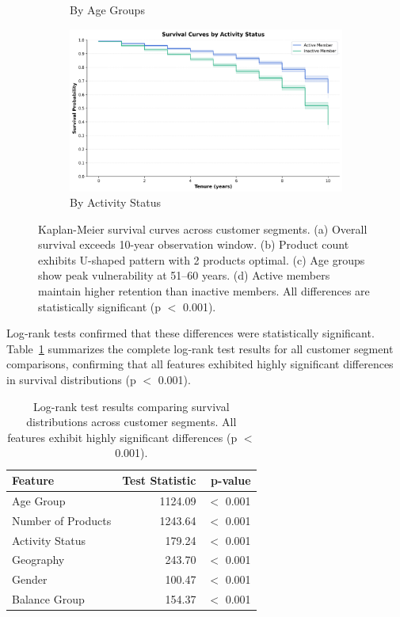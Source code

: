\documentclass[12pt]{article}
\begin{document}
\begin{figure}[H]
\begin{subfigure}[b]{0.48\textwidth}
\caption{By Age Groups}
\label{fig:survival_age}
\end{subfigure}
\hfill
\begin{subfigure}[b]{0.48\textwidth}
\centering
\includegraphics[width=\textwidth]{img/12_survival_active_status_plot.png}
\caption{By Activity Status}
\label{fig:survival_active}
\end{subfigure}
\caption{Kaplan-Meier survival curves across customer segments. (a) Overall survival exceeds 10-year observation window. (b) Product count exhibits U-shaped pattern with 2 products optimal. (c) Age groups show peak vulnerability at 51–60 years. (d) Active members maintain higher retention than inactive members. All differences are statistically significant (p $<$ 0.001).}
\label{fig:survival_all}
\end{figure}

Log‑rank tests confirmed that these differences were statistically significant. Table~\ref{tab:logrank_results} summarizes the complete log‑rank test results for all customer segment comparisons, confirming that all features exhibited highly significant differences in survival distributions (p $<$ 0.001).

\begin{table}[H]
\centering
\small
\caption{Log-rank test results comparing survival distributions across customer segments. All features exhibit highly significant differences (p $<$ 0.001).}
\label{tab:logrank_results}
\begin{tabular}{lrr}
\toprule
\textbf{Feature} & \textbf{Test Statistic} & \textbf{p-value} \\
\midrule
Age Group & 1124.09 & $<$ 0.001 \\
Number of Products & 1243.64 & $<$ 0.001 \\
Activity Status & 179.24 & $<$ 0.001 \\
Geography & 243.70 & $<$ 0.001 \\
Gender & 100.47 & $<$ 0.001 \\
Balance Group & 154.37 & $<$ 0.001 \\
\bottomrule
\end{tabular}
\end{table}
\end{document}
